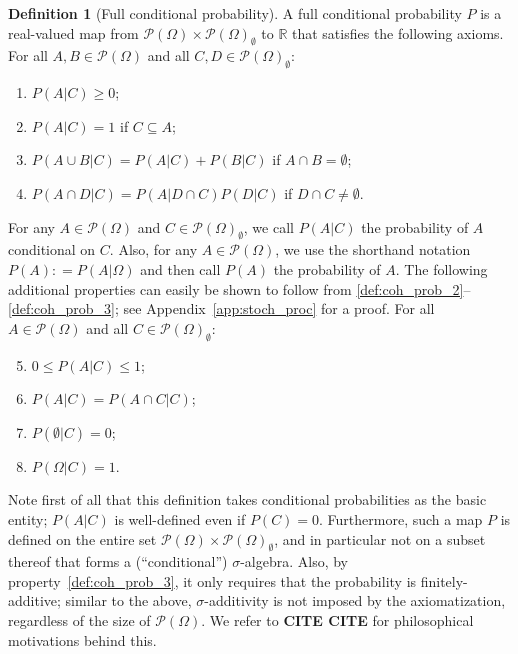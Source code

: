 \documentclass[10pt,a4paper]{paper}
\theoremstyle{definition}
\newtheorem{definition}{Definition}
\newcommand{\reals}{\mathbb{R}}
\newcommand{\paths}{\Omega}
\newcommand{\power}{\mathcal{P}(\paths)}
\newcommand{\nonemptypower}{\power_{\emptyset}}
\newcommand{\coloneqq}{:\!=}
\begin{document}
\begin{definition}[Full conditional probability]\label{def:cond_prob}
A full conditional probability $P$ is a real-valued map from $\power\times\nonemptypower$ to $\reals$ that satisfies the following axioms. For all $A,B\in\power$ and all \mbox{$C,D\in\nonemptypower$}:
\vspace{5pt}

\begin{enumerate}[label=F\arabic*:,ref=F\arabic*]
\item
$P(A\vert C)\geq 0$;\label{def:coh_prob_2}
\item
$P(A\vert C)=1$ if $C\subseteq A$;\label{def:coh_prob_1}
\item
$P(A\cup B\vert C)=P(A\vert C)+P(B\vert C)$ if $A\cap B=\emptyset$;\label{def:coh_prob_3}
\item
$P(A\cap D\vert C)=P(A\vert D\cap C)P(D\vert C)$ if $D\cap C\neq\emptyset$.\label{def:coh_prob_6}
\end{enumerate}
\vspace{5pt}

\noindent
For any $A\in\power$ and $C\in\nonemptypower$, we call $P(A\vert C)$ the probability of $A$ conditional on $C$. Also, for any $A\in\power$, we use the shorthand notation $P(A)\coloneqq P(A\vert\paths)$ and then call $P(A)$ the probability of $A$.
The following additional properties can easily be shown to follow from \ref{def:coh_prob_2}--\ref{def:coh_prob_3}; see Appendix~\ref{app:stoch_proc} for a proof. For all $A\in\power$ and all $C\in\nonemptypower$:
\vspace{5pt}
\begin{enumerate}[label=F\arabic*:,ref=F\arabic*]
\setcounter{enumi}{4}
\item
$0\leq P(A\vert C)\leq 1$;\label{def:coh_prob_2b}
\item
$P(A\vert C)=P(A\cap C\vert C)$;\label{def:coh_prob_7}
\item
$P(\emptyset\vert C)=0$;\label{def:coh_prob_8}
\item
$P(\Omega\vert C)=1$.\label{def:coh_prob_5}
\end{enumerate}
\vspace{5pt}
\end{definition}

Note first of all that this definition takes conditional probabilities as the basic entity; $P(A\vert C)$ is well-defined even if $P(C)=0$. Furthermore, such a map $P$ is defined on the entire set $\power\times\nonemptypower$, and in particular not on a subset thereof that forms a (``conditional'') $\sigma$-algebra. Also, by property~\ref{def:coh_prob_3}, it only requires that the probability is finitely-additive; similar to the above, $\sigma$-additivity is not imposed by the axiomatization, regardless of the size of $\power$.  We refer to {\bf CITE CITE} for philosophical motivations behind this.
\end{document}
